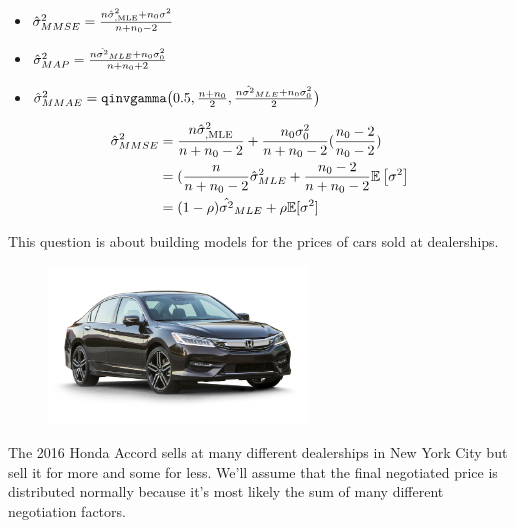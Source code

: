 \documentclass[12pt]{article}
\begin{document}
\begin{enumerate}
\begin{itemize}
    \item $\hat{\sigma}^2_{MMSE} = \frac{n\hat{\sigma}^2_{, \text{MLE}} + n_0\sigma^2}{n + n_0 - 2}$ 
    \item $\hat{\sigma}^2_{MAP} = \frac{ n \hat{\sigma^2}_{MLE} + n_0 \sigma^2_0 }{ n + n_0 + 2}$
    \item $\hat{\sigma}^2_{MMAE} = \texttt{qinvgamma} \big(0.5, \frac{ n + n_0}{2}, \frac{n \hat{\sigma^2}_{MLE} + n_0 \sigma^2_0 }{2}\big)$
\end{itemize}


 \begin{align*}
    \hat{\sigma}^2_{MMSE} &= \frac{n\hat{\sigma}^2_{, \text{MLE}}}{n + n_0 - 2} + \frac{n_0 \sigma^2_0}{ n + n_0 - 2} (\frac{n_0 - 2}{n_0 - 2}) \\
    &= (\frac{n}{n+n_0-2}\hat{\sigma}^2_{MLE}+ \frac{n_0-2}{n+n_0-2} \mathbb{E}\left[\sigma^2\right]\\
    &= (1-\rho)\hat{\sigma^2}_{MLE} + \rho \mathbb{E}[\sigma^2]
 \end{align*}



\end{enumerate}




\problem This question is about building models for the prices of cars sold at dealerships.

\begin{figure}[htp]
\centering
\includegraphics[width=2.7in]{accord.jpg}
\end{figure}

The 2016 Honda Accord sells at many different dealerships in New York City but sell it for more and some for less. We'll assume that the final negotiated price is distributed normally because it's most likely the sum of many different negotiation factors.
\end{document}

